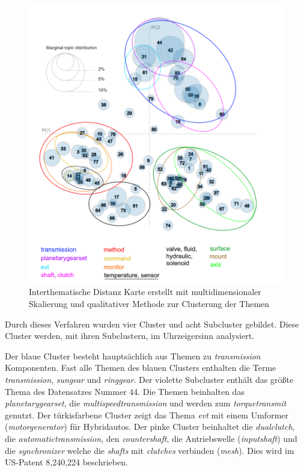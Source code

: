  \begin{figure}[htpb]
 	\centering
 	\includegraphics[width=\textwidth,keepaspectratio=true]{img/LDAvisGM-3-1-1_clustered.png}
 	\caption{
 		Interthematische Distanz Karte erstellt mit multidimensionaler Skalierung und qualitativer Methode zur Clusterung der Themen
 	}
 	\label{fig:Themengruppen_LDA_Unigramm}
 \end{figure}
 
Durch dieses Verfahren wurden vier Cluster und acht Subcluster gebildet. Diese Cluster werden, mit ihren Subclustern, im Uhrzeigersinn analysiert.

Der blaue Cluster besteht hauptsächlich aus Themen zu \emph{transmission} Komponenten. Fast alle Themen des blauen Clusters enthalten die Terme \emph{transmission}, \emph{sungear} und \emph{ringgear}. Der violette Subcluster enthält das größte Thema des Datensatzes Nummer 44. Die Themen beinhalten das \emph{planetarygearset}, die \emph{multispeedtransmission} und werden zum \emph{torquetransmit} genutzt. Der türkisfarbene Cluster zeigt das Thema \emph{\gls{evt}} mit einem Umformer (\emph{motorgenerator}) für Hybridautos. Der pinke Cluster beinhaltet die \emph{dualclutch}, die  \emph{automatictransmission}, den \emph{countershaft}, die Antriebswelle (\emph{inputshaft}) und die \emph{synchronizer} welche die \emph{shafts} mit \emph{clutches} verbinden (\emph{mesh}). Dies wird im US-Patent 8,240,224 beschrieben.


